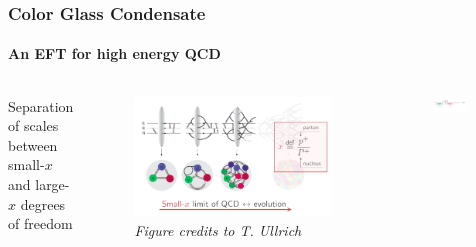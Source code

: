 \documentclass[aspectratio=169,11pt,usenames,dvipsnames]{beamer}
\begin{document}
\begin{frame}
    \frametitle{Color Glass Condensate}
    \framesubtitle{An EFT for high energy QCD}
    \vspace{-10pt}
    \begin{columns}[onlytextwidth,t]
            \begin{center}
                {\footnotesize Separation of scales between\\
                {\color{customgreen}small-{\tiny $x$}} and {\color{custompink}large-{\huge $x$}} degrees of freedom}
            \end{center}
            \vspace{-10pt}
            \begin{figure}[!hbt]
                \centering
                \includegraphics[width=\textwidth]{images/qcd_1.png}
                \captionsetup{justification=centering}
                \vspace{-20pt}
                \caption{\tiny\itshape Figure credits to T. Ullrich}
            \end{figure}
        \begin{center}
            {
            \begin{figure}[!hbt]
                \centering
                \includegraphics[width=0.9\textwidth]{images/small_large_x.png}

\end{figure}}
\end{center}
\end{columns}
\end{frame}
\end{document}
